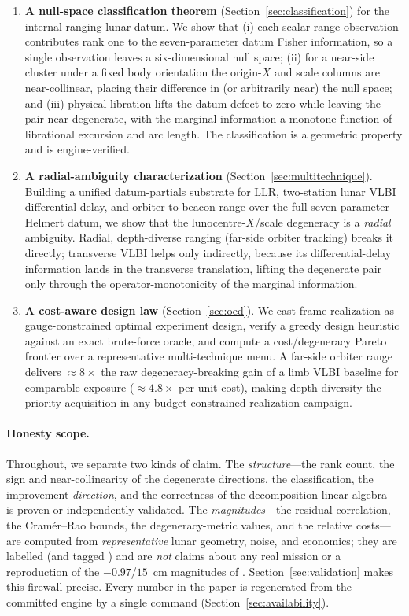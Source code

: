\begin{enumerate}
  \item \textbf{A null-space classification theorem} (Section~\ref{sec:classification})
  for the internal-ranging lunar datum. We show that (i) each scalar range
  observation contributes rank one to the seven-parameter datum Fisher
  information, so a single observation leaves a six-dimensional null space;
  (ii) for a near-side cluster under a fixed body orientation the origin-$X$ and
  scale columns are near-collinear, placing their difference in (or arbitrarily
  near) the null space; and (iii) physical libration lifts the datum defect to
  zero while leaving the pair near-degenerate, with the marginal information a
  monotone function of librational excursion and arc length. The classification
  is a geometric property and is engine-verified.

  \item \textbf{A radial-ambiguity characterization} (Section~\ref{sec:multitechnique}).
  Building a unified datum-partials substrate for LLR, two-station lunar VLBI
  differential delay, and orbiter-to-beacon range over the full seven-parameter
  Helmert datum, we show that the lunocentre-$X$/scale degeneracy is a
  \emph{radial} ambiguity. Radial, depth-diverse ranging (far-side orbiter
  tracking) breaks it directly; transverse VLBI helps only indirectly, because its
  differential-delay information lands in the transverse translation, lifting the
  degenerate pair only through the operator-monotonicity of the marginal
  information.

  \item \textbf{A cost-aware design law} (Section~\ref{sec:oed}). We cast frame
  realization as gauge-constrained optimal experiment design, verify a greedy
  design heuristic against an exact brute-force oracle, and compute a
  cost/degeneracy Pareto frontier over a representative multi-technique menu. A
  far-side orbiter range delivers $\approx\!8\times$ the raw degeneracy-breaking
  gain of a limb VLBI baseline for comparable exposure ($\approx\!4.8\times$ per
  unit cost), making depth diversity the priority acquisition in any
  budget-constrained realization campaign.
\end{enumerate}

\paragraph{Honesty scope.}
Throughout, we separate two kinds of claim. The \emph{structure}---the rank
count, the sign and near-collinearity of the degenerate directions, the
classification, the improvement \emph{direction}, and the correctness of the
decomposition linear algebra---is proven or independently validated. The
\emph{magnitudes}---the residual correlation, the Cram\'er--Rao bounds, the
degeneracy-metric values, and the relative costs---are computed from
\emph{representative} lunar geometry, noise, and economics; they are labelled
\Modelled{} (and tagged \modtag) and are \emph{not} claims about any real mission
or a reproduction of the $-0.97$/$15$~cm magnitudes of \citet{sosnica2025ilrf}.
Section~\ref{sec:validation} makes this firewall precise. Every number in the
paper is regenerated from the committed engine by a single command
(Section~\ref{sec:availability}).
